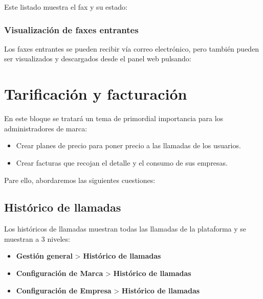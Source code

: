 \documentclass[letterpaper,10pt,spanish]{sphinxmanual}
\begin{document}

Este listado muestra el fax y su estado:



\subsection{Visualización de faxes entrantes}
\label{faxing/index:incoming-faxes-display}
Los faxes entrantes se pueden recibir vía correo electrónico, pero también pueden ser visualizados y descargados desde el panel web pulsando:

\noindent{}


\chapter{Tarificación y facturación}
\label{billing_and_invoices/index::doc}\label{billing_and_invoices/index:billing-and-invoices}
En este bloque se tratará un tema de primordial importancia para los administradores de marca:
\begin{itemize}
\item {} 
Crear planes de precio para poner precio a las llamadas de los usuarios.

\item {} 
Crear facturas que recojan el detalle y el consumo de sus empresas.

\end{itemize}

Pare ello, abordaremos las siguientes cuestiones:


\section{Histórico de llamadas}
\label{billing_and_invoices/call_registry::doc}\label{billing_and_invoices/call_registry:call-registry}\label{billing_and_invoices/call_registry:id1}
Los históricos de llamadas muestran todas las llamadas de la plataforma y se muestran a 3 niveles:
\begin{itemize}
\item {} 
\textbf{Gestión general} \textgreater{} \textbf{Histórico de llamadas}

\item {} 
\textbf{Configuración de Marca} \textgreater{} \textbf{Histórico de llamadas}

\item {} 
\textbf{Configuración de Empresa} \textgreater{} \textbf{Histórico de llamadas}

\end{itemize}
\end{document}
